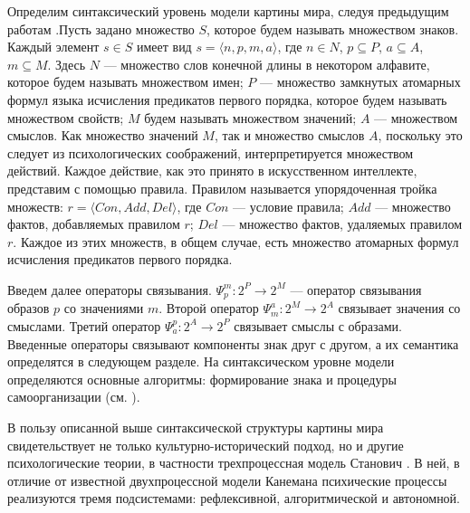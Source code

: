 \documentclass[12pt]{scrartcl}
\begin{document}
	Определим синтаксический уровень модели картины мира, следуя предыдущим работам \cite{Osipov2014c,Osipov2016c}.Пусть задано множество $S$, которое будем называть множеством знаков. Каждый элемент $s\in S$ имеет вид $s=\langle n,p,m,a\rangle$, где $n\in N$, $p\subseteq P$, $a\subseteq A$, $m\subseteq M$. Здесь $N$ --- множество слов конечной длины в некотором алфавите, которое будем называть множеством имен; $P$ --- множество замкнутых атомарных формул языка исчисления предикатов первого порядка, которое будем называть множеством свойств; $M$ будем называть множеством значений; $A$ — множеством смыслов. Как множество значений $M$, так и множество смыслов $A$, поскольку это следует из психологических соображений, интерпретируется множеством действий. Каждое действие, как это принято в искусственном интеллекте, представим с помощью правила. Правилом называется упорядоченная тройка множеств:	$r=\langle Con,Add,Del\rangle$, где $Con$ --- условие правила; $Add$ --- множество фактов, добавляемых правилом $r$; $Del$ --- множество фактов, удаляемых правилом $r$. Каждое из этих множеств, в общем случае, есть множество атомарных формул исчисления предикатов первого порядка.
	
	Введем далее операторы связывания. $\Psi_p^m:2^P\rightarrow 2^M$ --- оператор связывания образов $p$ со значениями $m$. Второй оператор	$\Psi_m^a:2^M\rightarrow 2^A$ связывает значения со	смыслами. Третий оператор $\Psi_a^p: 2^A\rightarrow 2^P$ связывает смыслы с образами. Введенные операторы связывают компоненты знак друг с другом, а их семантика определятся в следующем разделе. На синтаксическом уровне модели определяются основные алгоритмы: формирование знака и процедуры самоорганизации (см. \cite{Osipov2014c}).
	
	В пользу описанной выше синтаксической структуры картины мира свидетельствует не только культурно-исторический подход, но и другие психологические теории, в частности трехпроцессная модель Станович \cite{Stanovich2009}. В ней, в отличие от известной двухпроцессной модели Канемана \cite{Kahneman2011} психические процессы реализуются тремя подсистемами: рефлексивной, алгоритмической и автономной. 
	
\end{document}
